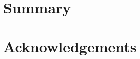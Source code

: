 \hypertarget{summary}{%
  \section{Summary}}

\hypertarget{acknowledgements}{%
  \section{Acknowledgements}}

